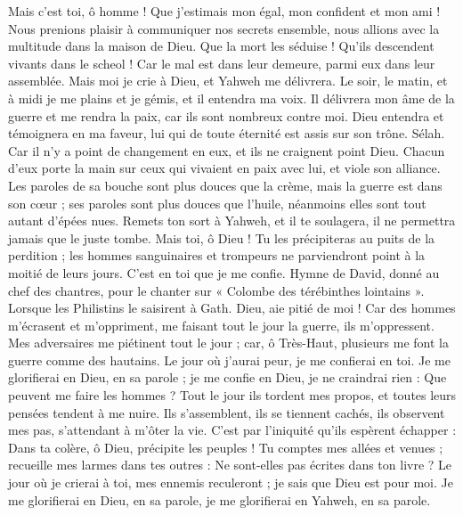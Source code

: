 \begin{multicols}{2}
Mais c'est toi, ô homme ! Que j'estimais mon égal, mon confident et mon ami !
Nous prenions plaisir à communiquer nos secrets ensemble, nous allions avec la multitude dans la maison de Dieu.
Que la mort les séduise ! Qu'ils descendent vivants dans le scheol ! Car le mal est dans leur demeure, parmi eux dans leur assemblée.
Mais moi je crie à Dieu, et Yahweh me délivrera.
Le soir, le matin, et à midi je me plains et je gémis, et il entendra ma voix.
Il délivrera mon âme de la guerre et me rendra la paix, car ils sont nombreux contre moi.
Dieu entendra et témoignera en ma faveur, lui qui de toute éternité est assis sur son trône. Sélah. Car il n'y a point de changement en eux, et ils ne craignent point Dieu.
Chacun d'eux porte la main sur ceux qui vivaient en paix avec lui, et viole son alliance.
Les paroles de sa bouche sont plus douces que la crème, mais la guerre est dans son cœur ; ses paroles sont plus douces que l'huile, néanmoins elles sont tout autant d'épées nues.
Remets ton sort à Yahweh, et il te soulagera, il ne permettra jamais que le juste tombe.
Mais toi, ô Dieu ! Tu les précipiteras au puits de la perdition ; les hommes sanguinaires et trompeurs ne parviendront point à la moitié de leurs jours. C'est en toi que je me confie.
\VerseOne{}Hymne de David, donné au chef des chantres, pour le chanter sur « Colombe des térébinthes lointains ». Lorsque les Philistins le saisirent à Gath.
Dieu, aie pitié de moi ! Car des hommes m'écrasent et m'oppriment, me faisant tout le jour la guerre, ils m'oppressent.
Mes adversaires me piétinent tout le jour ; car, ô Très-Haut, plusieurs me font la guerre comme des hautains.
Le jour où j'aurai peur, je me confierai en toi.
Je me glorifierai en Dieu, en sa parole ; je me confie en Dieu, je ne craindrai rien : Que peuvent me faire les hommes ?
Tout le jour ils tordent mes propos, et toutes leurs pensées tendent à me nuire.
Ils s'assemblent, ils se tiennent cachés, ils observent mes pas, s'attendant à m'ôter la vie.
C'est par l'iniquité qu'ils espèrent échapper : Dans ta colère, ô Dieu, précipite les peuples !
Tu comptes mes allées et venues ; recueille mes larmes dans tes outres : Ne sont-elles pas écrites dans ton livre ?
Le jour où je crierai à toi, mes ennemis reculeront ; je sais que Dieu est pour moi.
Je me glorifierai en Dieu, en sa parole, je me glorifierai en Yahweh, en sa parole.

\end{multicols}
